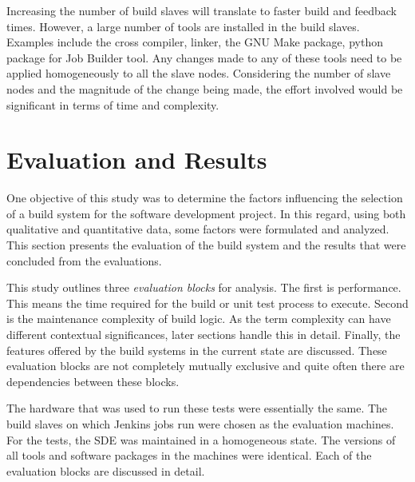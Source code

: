 \documentclass[12pt, a4paper, titlepage]{scrartcl}
\begin{document}
\par Increasing the number of build slaves will translate to faster build and feedback times. However, a large number of tools are installed in the build slaves. Examples include the cross compiler, linker, the GNU Make package, python package for Job Builder tool. Any changes made to any of these tools need to be applied homogeneously to all the slave nodes. Considering the number of slave nodes and the magnitude of the change being made, the effort involved would be significant in terms of time and complexity.   
\section{Evaluation and Results}
\par One objective of this study was to determine the factors influencing the selection of a build system for the software development project. In this regard, using both qualitative and quantitative data, some factors were formulated and analyzed. This section presents the evaluation of the build system and the results that were concluded from the evaluations. 
\par This study outlines three \emph{evaluation blocks} for analysis. The first is performance. This means the time required for the build or unit test process to execute. Second is the maintenance complexity of build logic. As the term complexity can have different contextual significances, later sections handle this in detail. Finally, the features offered by the build systems in the current state are discussed. These evaluation blocks are not completely mutually exclusive and quite often there are dependencies between these blocks. 
\par The hardware that was used to run these tests were essentially the same. The build slaves on which Jenkins jobs run were chosen as the evaluation machines. For the tests, the SDE was maintained in a homogeneous state. The versions of all tools and software packages in the machines were identical. Each of the evaluation blocks are discussed in detail. 
\end{document}
